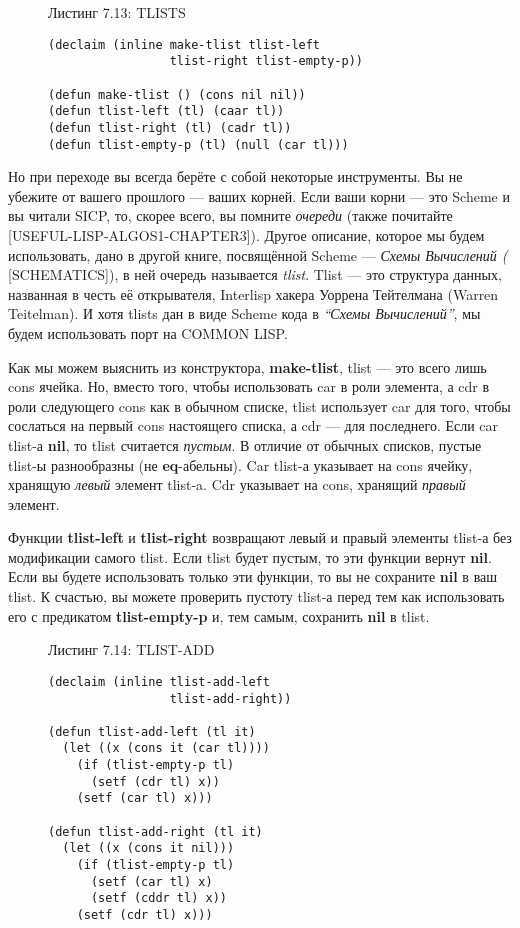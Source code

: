 \begin{figure}Листинг 7.13: TLISTS\label{listing_7.13}
\listbegin
\begin{verbatim}
(declaim (inline make-tlist tlist-left
                 tlist-right tlist-empty-p))

(defun make-tlist () (cons nil nil))
(defun tlist-left (tl) (caar tl))
(defun tlist-right (tl) (cadr tl))
(defun tlist-empty-p (tl) (null (car tl)))
\end{verbatim}
\listend
\end{figure}

Но при переходе вы всегда берёте с собой некоторые инструменты. Вы не убежите от вашего прошлого --- ваших корней. Если ваши корни --- это Scheme и вы читали SICP, то, скорее всего, вы помните \emph{очереди } (также почитайте [USEFUL-LISP-ALGOS1-CHAPTER3]). Другое описание, которое мы будем использовать, дано в другой книге, посвящённой Scheme --- \emph{Схемы Вычислений (} [SCHE\-MA\-TICS]), в ней очередь называется \emph{tlist}. Tlist --- это структура данных, названная в честь её открывателя, Interlisp хакера Уоррена Тейтелмана (Warren Teitelman). И хотя tlists дан в виде Scheme кода в \emph{``Схемы Вычислений''}, мы будем использовать порт на COMMON LISP.

Как мы можем выяснить из конструктора, \textbf{make-tlist}, tlist --- это всего лишь cons ячейка. Но, вместо того, чтобы использовать car в роли элемента, а cdr в роли следующего cons как в обычном списке, tlist использует car для того, чтобы сослаться на первый cons настоящего списка, а cdr --- для последнего. Если car tlist-а \textbf{nil}, то tlist считается \emph{пустым}. В отличие от обычных списков, пустые tlist-ы разнообразны (не \textbf{eq}-абельны). Car tlist-а указывает на cons ячейку, хранящую \emph{левый} элемент tlist-a. Cdr указывает на cons, хранящий \emph{правый} элемент.

Функции \textbf{tlist-left} и \textbf{tlist-right} возвращают левый и правый элементы tlist-а без модификации самого tlist. Если tlist будет пустым, то эти функции вернут \textbf{nil}. Если вы будете использовать только эти функции, то вы не сохраните \textbf{nil} в ваш tlist. К счастью, вы можете проверить пустоту tlist-а перед тем как использовать его с предикатом \textbf{tlist-empty-p} и, тем самым, сохранить \textbf{nil} в tlist.

\begin{figure}Листинг 7.14: TLIST-ADD\label{listing_7.14}
\listbegin
\begin{verbatim}
(declaim (inline tlist-add-left
                 tlist-add-right))

(defun tlist-add-left (tl it)
  (let ((x (cons it (car tl))))
    (if (tlist-empty-p tl)
      (setf (cdr tl) x))
    (setf (car tl) x)))

(defun tlist-add-right (tl it)
  (let ((x (cons it nil)))
    (if (tlist-empty-p tl)
      (setf (car tl) x)
      (setf (cddr tl) x))
    (setf (cdr tl) x)))
\end{verbatim}
\listend
\end{figure}

